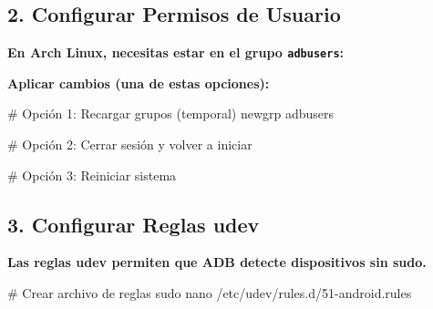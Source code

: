 \documentclass[
  doc,
  floatsintext,
  longtable,
  a4paper,
  nolmodern,
  notxfonts,
  notimes,
  12pt,
  colorlinks=true,linkcolor=blue,citecolor=blue,urlcolor=blue]{apa7}
\newenvironment{Shaded}{\begin{snugshade}}{\end{snugshade}}
\newcommand{\AttributeTok}[1]{\textcolor[rgb]{0.40,0.45,0.13}{#1}}
\newcommand{\CommentTok}[1]{\textcolor[rgb]{0.37,0.37,0.37}{#1}}
\newcommand{\ExtensionTok}[1]{\textcolor[rgb]{0.00,0.23,0.31}{#1}}
\newcommand{\FunctionTok}[1]{\textcolor[rgb]{0.28,0.35,0.67}{#1}}
\newcommand{\KeywordTok}[1]{\textcolor[rgb]{0.00,0.23,0.31}{\textbf{#1}}}
\newcommand{\NormalTok}[1]{\textcolor[rgb]{0.00,0.23,0.31}{#1}}
\newcommand{\VariableTok}[1]{\textcolor[rgb]{0.07,0.07,0.07}{#1}}
\begin{document}
\subsection{2. Configurar Permisos de
Usuario}\label{configurar-permisos-de-usuario}

\textbf{En Arch Linux, necesitas estar en el grupo \texttt{adbusers}:}

\begin{Shaded}
\end{Shaded}

\textbf{Aplicar cambios (una de estas opciones):}

\begin{Shaded}
\begin{Highlighting}[]
\CommentTok{\# Opción 1: Recargar grupos (temporal)}
\ExtensionTok{newgrp}\NormalTok{ adbusers}

\CommentTok{\# Opción 2: Cerrar sesión y volver a iniciar}

\CommentTok{\# Opción 3: Reiniciar sistema}
\end{Highlighting}
\end{Shaded}

\subsection{3. Configurar Reglas udev}\label{configurar-reglas-udev}

\textbf{Las reglas udev permiten que ADB detecte dispositivos sin sudo.}

\begin{Shaded}
\begin{Highlighting}[]
\CommentTok{\# Crear archivo de reglas}
\FunctionTok{sudo}\NormalTok{ nano /etc/udev/rules.d/51{-}android.rules}
\end{Highlighting}
\end{Shaded}
\end{document}
